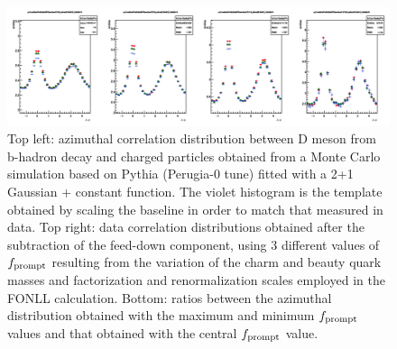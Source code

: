 \begin{figure}
\includegraphics[width=.49\linewidth]{figures/Template/1DCompare_allDpTfromC_AssoPt_0.3to99.0GeVc_Pythia8.png}
\caption{Top left: azimuthal correlation distribution between D meson from b-hadron decay and charged particles obtained from a Monte Carlo simulation
based on Pythia (Perugia-0 tune) fitted with a 2+1 Gaussian + constant function. The violet histogram is the template obtained by scaling the baseline
in order to match that measured in data. Top right: data correlation distributions obtained after the subtraction of the feed-down component, using 3 different values of $f_{\rm prompt}$ resulting
from the variation of the charm and beauty quark masses and factorization and renormalization scales employed in the FONLL calculation. Bottom: ratios between the azimuthal
distribution obtained with the maximum and minimum $f_{\rm prompt}$ values and that obtained with the central $f_{\rm prompt}$ value.}
\label{templates}
\end{figure}


\newpage %
